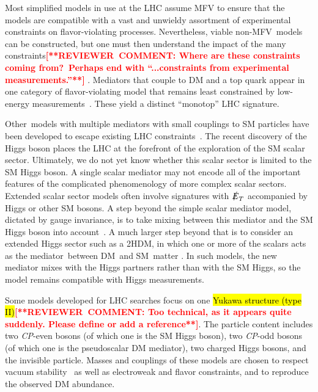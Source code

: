 \documentclass{ar-1col}
\newcommand{\IP}{invisible particle}
\newcommand{\MET}{\ensuremath{\slashed{E}_T}\xspace}
\begin{document}
Most simplified models in use at the LHC assume MFV to ensure that
the models are compatible with a vast and unwieldy assortment of
experimental constraints on flavor-violating processes.
Nevertheless, viable non-MFV\ models can be constructed, but one must then understand the impact of the
many constraints\textbf{\textcolor{red}{[**REVIEWER\ COMMENT: Where are these constraints coming from?\ Perhaps end with ``...constraints from experimental measurements.''**]}} \cite{Blanke:2017tnb}. Mediators that couple to
DM and a top quark appear in one category of flavor-violating
model that remains least constrained by low-energy
measurements~\cite{Boucheneb:2014wza}. These yield a distinct
``monotop'' LHC signature.

Other~{models with multiple mediators} with small couplings
to SM particles have been developed to escape existing LHC
constraints~\cite{Duerr:2016tmh}. The recent discovery of the
Higgs boson places the LHC at the forefront of the exploration of the
SM scalar sector. Ultimately, we do not yet know whether this scalar
sector is limited to the SM Higgs boson. A single scalar mediator
may not encode all of the important features of the complicated
phenomenology of more {complex scalar sectors}. Extended
scalar sector models often involve signatures with \MET accompanied by Higgs or other SM bosons. A step beyond the
simple scalar mediator model, dictated by gauge invariance, is to take mixing between this
mediator and the SM Higgs boson
into account~\cite{Bauer:2016gys,Berlin:2014cfa}. A much larger
step beyond that is to consider an extended Higgs sector such as a
2HDM, in which one or more of the scalars
acts as the mediator~between DM\ and SM\ matter \cite{Bauer:2017ota,Goncalves:2016iyg,Bell:2016ekl}. In
such models, the new mediator mixes with the Higgs partners
rather than with the SM Higgs, so the model remains
compatible with Higgs measurements. 

Some models developed for LHC
searches focus on one \hl{Yukawa structure (type II)}\textbf{\textcolor{red}{[**REVIEWER\ COMMENT: Too technical, as it appears quite suddenly. Please define or add a reference**]}}. The particle
content includes two \textit{CP}-even bosons (of which one is the SM Higgs
boson), two \textit{CP}-odd bosons (of which one is the pseudoscalar DM
mediator), two charged Higgs bosons, and the \IP. Masses and
couplings of these models are chosen to respect vacuum
stability~\cite{Goncalves:2016iyg} as well as electroweak and flavor
constraints, and to reproduce the observed DM abundance.
\end{document}
